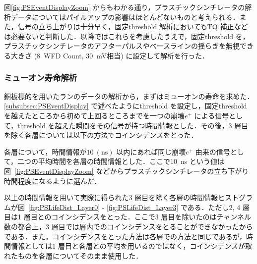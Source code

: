 図\ref{fig:PSEventDisplayZoom} からもわかる通り，プラスチックシンチレータの解析データについてはパイルアップの影響はほとんどないものと考えられる．また，信号の立ち上がりは十分早く，固定threshold 解析においてもTQ 補正などは必要ないと判断した．以降ではこれらを考慮したうえで，固定threshold を，プラスチックシンチレータのアフターパルスやベースラインの揺らぎを無視できる大きさ (8~WFD Count, 30~mV相当) に設定して解析を行った．

\subsubsection{ミューオン寿命解析}
\label{subsubsec:PSLife}
銅板標的を用いたランのデータの解析から，まずはミューオンの寿命を求めた．\ref{subsubsec:PSEventDisplay} で述べたようにthreshold を設定し，固定threshold を越えたところから初めて上回るところまでを一つの崩壊$e^{+}$ による信号として，threshold を超えた瞬間をその信号が持つ時間情報とした．その後，3 層目を除く各層については以下の方法でコインシデンスをとった．

各層について，時間情報が$10~(\mathrm{ns})$ 以内にあれば同じ崩壊$e^{+}$ 由来の信号として，二つの平均時間を各層の時間情報とした．ここで10~ns という値は図~\ref{fig:PSEventDisplayZoom} などからプラスチックシンチレータの立ち下がり時間程度になるように選んだ．

以上の時間情報を用いて実際に得られた3 層目を除く各層の時間情報ヒストグラムが図~\ref{fig:PSLifeDist_Layer0} - \ref{fig:PSLifeDist_Layer3} である．ただし2, 4 層目は1 層目とのコインシデンスをとった．ここで3 層目を除いたのはチャンネル数の都合上，3 層目では層内でのコインシデンスをとることができなかったからである．また，コインシデンスをとった方法は各層での方法と同じであるが，時間情報としては1 層目と各層との平均を用いるのではなく，コインシデンスが取れたものを各層についてそのまま使用した．

